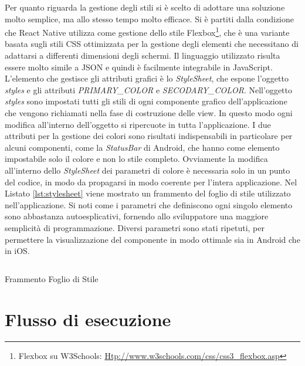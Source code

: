 Per quanto riguarda la gestione degli stili si è scelto di adottare una soluzione molto semplice, ma allo stesso tempo molto efficace. Si è partiti dalla condizione che React Native utilizza come gestione dello stile Flexbox\footnote{Flexbox su W3Schools: \url{Htp://www.w3schools.com/css/css3_flexbox.asp}}, che è una variante basata sugli stili CSS ottimizzata per la gestione degli elementi che necessitano di adattarsi a differenti dimensioni degli schermi. Il linguaggio utilizzato risulta essere molto simile a JSON e quindi è facilmente integrabile in JavaScript. L'elemento che gestisce gli attributi grafici è lo \emph{StyleSheet}, che espone l'oggetto \emph{styles} e gli attributi \emph{PRIMARY\_COLOR} e \emph{SECODARY\_COLOR}.
Nell'oggetto \emph{styles} sono impostati tutti gli stili di ogni componente grafico dell'applicazione che vengono richiamati nella fase di costruzione delle view. In questo modo ogni modifica all'interno dell'oggetto si ripercuote in tutta l'applicazione.
I due attributi per la gestione dei colori sono risultati indispensabili in particolare per alcuni componenti, come la \emph{StatusBar} di Android, che hanno come elemento impostabile solo il colore e non lo stile completo. Ovviamente la modifica all'interno dello \emph{StyleSheet} dei parametri di colore è necessaria solo in un punto del codice, in modo da propagarsi in modo coerente per l'intera applicazione.
Nel Listato \ref{lst:stylesheet} viene mostrato un frammento del foglio di stile utilizzato nell'applicazione. Si noti come i parametri che definiscono ogni singolo elemento sono abbastanza autoesplicativi, fornendo allo sviluppatore una maggiore semplicità di programmazione. Diversi parametri sono stati ripetuti, per permettere la visualizzazione del componente in modo ottimale sia in Android che in iOS.

\begin{listing}[H]
	\inputminted{js}{6-implementazione-app/Codice/stylesheet.js}
	\caption{Frammento Foglio di Stile}
	\label{lst:stylesheet}
\end{listing}
 

\section{Flusso di esecuzione}

